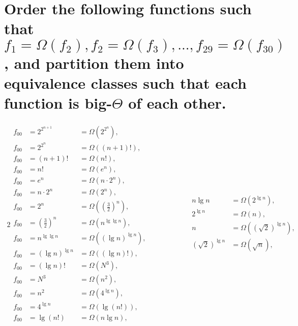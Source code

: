 \section[Problem 6]{Order the following functions such that $f_1 = \Omega(f_2), f_2 = \Omega(f_3), ..., f_{29} = \Omega(f_{30})$, and partition them into equivalence classes such that each function is big-$\Theta$ of each other.}

\begin{alignat*}{2}
	\begin{aligned}
		f_00 &= 2^{2^{n + 1}} &= \Omega \left(2^{2^n} \right), \\
		f_00 &= 2^{2^n} &= \Omega \left((n + 1)! \right), \\
		f_00 &= (n + 1)! &= \Omega \left(n! \right), \\
		f_00 &= n! &= \Omega \left(e^n \right), \\
		f_00 &= e^n &= \Omega \left(n \cdot 2^n \right), \\
		f_00 &= n \cdot 2^n &= \Omega \left(2^n \right), \\
		f_00 &= 2^n &= \Omega \left(\left( \frac{3}{2} \right)^n \right), \\
		f_00 &= \left( \frac{3}{2} \right)^n &= \Omega \left(n^{\lg \lg n} \right), \\
		f_00 &= n^{\lg \lg n} &= \Omega \left(\left( \lg n \right)^{\lg n} \right), \\
		f_00 &= \left( \lg n \right)^{\lg n} &= \Omega \left((\lg n)! \right), \\
		f_00 &= (\lg n)! &= \Omega \left(N^3 \right), \\
		f_00 &= N^3 &= \Omega \left(n^2 \right), \\
		f_00 &= n^2 &= \Omega \left(4^{\lg n} \right), \\
		f_00 &= 4^{\lg n} &= \Omega \left(\lg (n!) \right), \\
		f_00 &= \lg (n!)  &= \Omega \left(n \lg n \right), \\
	\end{aligned}
	& \qquad \qquad &
	\begin{aligned}
		n \lg n &= \Omega \left(2^{\lg n} \right), \\
		2^{\lg n} &= \Omega \left(n \right), \\
		n &= \Omega \left(\left( \sqrt{2} \right)^{\lg n} \right), \\
		\left( \sqrt{2} \right)^{\lg n} &= \Omega \left(\sqrt{n} \right), \\

\end{aligned}
\end{alignat*}
